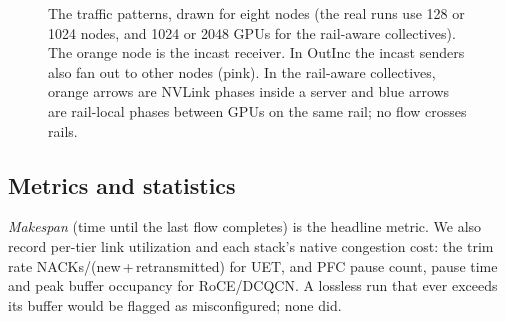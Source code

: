 \documentclass[conference]{IEEEtran}
\newcommand{\ring}[1]{%
  \foreach \i in {0,...,7} \node[nd] (#1\i) at ({90-\i*45}:0.78) {\i};}
\begin{document}
\begin{figure}[t]
{}
\caption{The traffic patterns, drawn for eight nodes (the real runs use 128 or
1024 nodes, and 1024 or 2048 GPUs for the rail-aware collectives). The orange
node is the incast receiver. In OutInc the incast senders also fan out to
other nodes (pink). In the rail-aware collectives, orange arrows are NVLink
phases inside a server and blue arrows are rail-local phases between GPUs on
the same rail; no flow crosses rails.}
\label{fig:workloads}
\end{figure}

\subsection{Metrics and statistics}
\emph{Makespan} (time until the last flow completes) is the headline metric. We
also record per-tier link utilization and each stack's native congestion cost:
the trim rate NACKs/(new\,+\,retransmitted) for UET, and PFC pause count, pause
time and peak buffer occupancy for RoCE/DCQCN. A lossless run that ever exceeds
its buffer would be flagged as misconfigured; none did.
\end{document}
